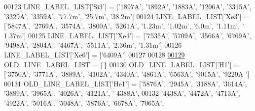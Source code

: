 \begin{DoxyCode}
{{00123 LINE\_LABEL\_LIST[\textcolor{stringliteral}{'Si3'}] = [\textcolor{stringliteral}{'1897A'}, \textcolor{stringliteral}{'1892A'}, \textcolor{stringliteral}{'1883A'}, \textcolor{stringliteral}{'1206A'}, \textcolor{stringliteral}{'3315A'}, \textcolor{stringliteral}{'3329A'}, \textcolor{stringliteral}{'3359A'}, \textcolor{stringliteral}{'77.7m'}, \textcolor{stringliteral}{'25.7m'}, \textcolor{stringliteral}{
      '38.2m'}]
00124 LINE\_LABEL\_LIST[\textcolor{stringliteral}{'Xe3'}] = [\textcolor{stringliteral}{'5847A'}, \textcolor{stringliteral}{'2769A'}, \textcolor{stringliteral}{'3574A'}, \textcolor{stringliteral}{'3800A'}, \textcolor{stringliteral}{'5261A'}, \textcolor{stringliteral}{'1.23m'}, \textcolor{stringliteral}{'1.02m'}, \textcolor{stringliteral}{'6.0m'}, \textcolor{stringliteral}{'1.11m'}, \textcolor{stringliteral}{'
      1.37m'}]
00125 LINE\_LABEL\_LIST[\textcolor{stringliteral}{'Xe4'}] = [\textcolor{stringliteral}{'7535A'}, \textcolor{stringliteral}{'5709A'}, \textcolor{stringliteral}{'3566A'}, \textcolor{stringliteral}{'6769A'}, \textcolor{stringliteral}{'9498A'}, \textcolor{stringliteral}{'2804A'}, \textcolor{stringliteral}{'4467A'}, \textcolor{stringliteral}{'5511A'}, \textcolor{stringliteral}{'2.36m'}, \textcolor{stringliteral}{
      '1.31m'}]
00126 LINE\_LABEL\_LIST[\textcolor{stringliteral}{'Xe6'}] = [\textcolor{stringliteral}{'6409A'}]
00127 
00128 
\hypertarget{init_8py_source_l00129}{}\hyperlink{namespacepyneb_1_1utils_1_1init_aae3ff006599d45be21cb0b2753f14802}{00129} OLD\_LINE\_LABEL\_LIST = \{\}
00130 OLD\_LINE\_LABEL\_LIST[\textcolor{stringliteral}{'H1'}] = [\textcolor{stringliteral}{'3750A'}, \textcolor{stringliteral}{'3771A'}, \textcolor{stringliteral}{'3889A'}, \textcolor{stringliteral}{'4102A'}, \textcolor{stringliteral}{'4340A'}, \textcolor{stringliteral}{'4861A'}, \textcolor{stringliteral}{'6563A'}, \textcolor{stringliteral}{'9015A'}, \textcolor{stringliteral}{'9229A
      '}]
00131 OLD\_LINE\_LABEL\_LIST[\textcolor{stringliteral}{'He1'}] = [\textcolor{stringliteral}{'5876A'}, \textcolor{stringliteral}{'2945A'}, \textcolor{stringliteral}{'3188A'}, \textcolor{stringliteral}{'3614A'}, \textcolor{stringliteral}{'3889A'}, \textcolor{stringliteral}{'3965A'}, \textcolor{stringliteral}{'4026A'}, \textcolor{stringliteral}{'4121A'}, \textcolor{stringliteral}{'
      4388A'},
00132                           \textcolor{stringliteral}{'4438A'}, \textcolor{stringliteral}{'4472A'}, \textcolor{stringliteral}{'4713A'}, \textcolor{stringliteral}{'4922A'}, \textcolor{stringliteral}{'5016A'}, \textcolor{stringliteral}{'5048A'}, \textcolor{stringliteral}{'5876A'}, \textcolor{stringliteral}{'6678A'}, \textcolor{stringliteral}{'7065A'},
}}
\end{DoxyCode}
